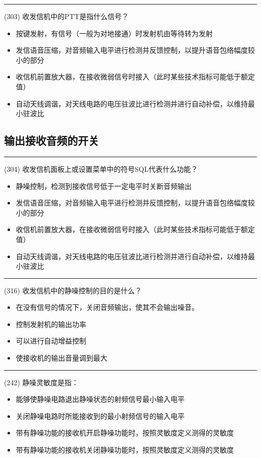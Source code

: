 \documentclass[twocolumn,hyperref,UTF8]{ctexart}  %
\begin{document}
\noindent\rule{0.5\textwidth}{1pt}
\heiti (303) 收发信机中的PTT是指什么信号？ \songti {\color{gray} [LK0258] }
\begin{itemize}
	\item  按键发射，有信号（一般为对地接通）时发射机由等待转为发射
	\item  发信语音压缩，对音频输入电平进行检测并反馈控制，以提升语音包络幅度较小的部分
	\item  收信机前置放大器，在接收微弱信号时接入（此时某些技术指标可能低于额定值）
	\item  自动天线调谐，对天线电路的电压驻波比进行检测并进行自动补偿，以维持最小驻波比
\end{itemize}


\clearpage
\subsection{输出接收音频的开关}


\noindent\rule{0.5\textwidth}{1pt}
\heiti (304) 收发信机面板上或设置菜单中的符号SQL代表什么功能？ \songti {\color{gray} [LK0259] }
\begin{itemize}
	\item  静噪控制，检测到接收信号低于一定电平时关断音频输出
	\item  发信语音压缩，对音频输入电平进行检测并反馈控制，以提升语音包络幅度较小的部分
	\item  收信机前置放大器，在接收微弱信号时接入（此时某些技术指标可能低于额定值）
	\item  自动天线调谐，对天线电路的电压驻波比进行检测并进行自动补偿，以维持最小驻波比
\end{itemize}


\noindent\rule{0.5\textwidth}{1pt}
\heiti (316) 收发信机中的静噪控制的目的是什么？ \songti {\color{gray} [LK1130] }
\begin{itemize}
	\item  在没有信号的情况下，关闭音频输出，使其不会输出噪音。
	\item  控制发射机的输出功率
	\item  可以进行自动增益控制
	\item  使接收机的输出音量调到最大
\end{itemize}


\noindent\rule{0.5\textwidth}{1pt}
\heiti (242) 静噪灵敏度是指： \songti {\color{gray} [LK0819] }
\begin{itemize}
	\item  能够使静噪电路退出静噪状态的射频信号最小输入电平
	\item  关闭静噪电路时所能接收到的最小射频信号的输入电平
	\item  带有静噪功能的接收机开启静噪功能时，按照灵敏度定义测得的灵敏度
	\item  带有静噪功能的接收机关闭静噪功能时，按照灵敏度定义测得的灵敏度
\end{itemize}
\end{document}
